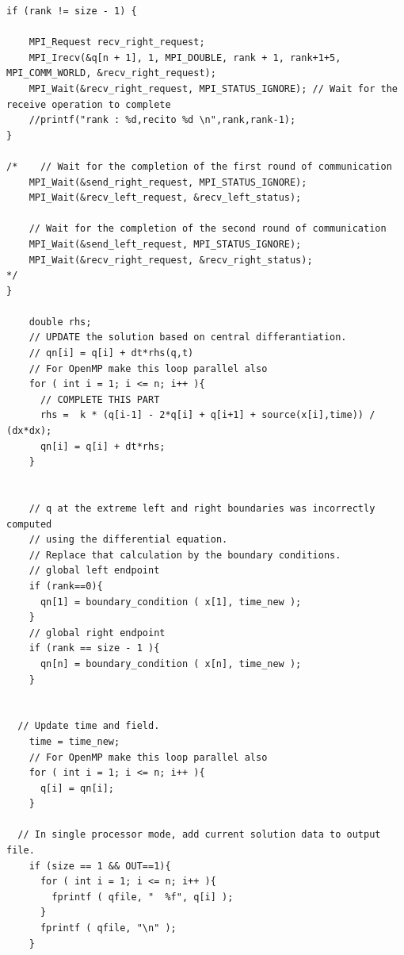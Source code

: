 \documentclass{article}
\begin{document}
\begin{verbatim}
if (rank != size - 1) {

    MPI_Request recv_right_request;
    MPI_Irecv(&q[n + 1], 1, MPI_DOUBLE, rank + 1, rank+1+5, MPI_COMM_WORLD, &recv_right_request);
    MPI_Wait(&recv_right_request, MPI_STATUS_IGNORE); // Wait for the receive operation to complete
    //printf("rank : %d,recito %d \n",rank,rank-1);
}

/*    // Wait for the completion of the first round of communication
    MPI_Wait(&send_right_request, MPI_STATUS_IGNORE);
    MPI_Wait(&recv_left_request, &recv_left_status);

    // Wait for the completion of the second round of communication
    MPI_Wait(&send_left_request, MPI_STATUS_IGNORE);
    MPI_Wait(&recv_right_request, &recv_right_status);
*/
}

    double rhs;
    // UPDATE the solution based on central differantiation.
    // qn[i] = q[i] + dt*rhs(q,t)
    // For OpenMP make this loop parallel also
    for ( int i = 1; i <= n; i++ ){
      // COMPLETE THIS PART
      rhs =  k * (q[i-1] - 2*q[i] + q[i+1] + source(x[i],time)) / (dx*dx); 
      qn[i] = q[i] + dt*rhs;
    }

  
    // q at the extreme left and right boundaries was incorrectly computed
    // using the differential equation.  
    // Replace that calculation by the boundary conditions.
    // global left endpoint 
    if (rank==0){
      qn[1] = boundary_condition ( x[1], time_new );
    }
    // global right endpoint 
    if (rank == size - 1 ){
      qn[n] = boundary_condition ( x[n], time_new );
    }


  // Update time and field.
    time = time_new;
    // For OpenMP make this loop parallel also
    for ( int i = 1; i <= n; i++ ){
      q[i] = qn[i];
    }

  // In single processor mode, add current solution data to output file.
    if (size == 1 && OUT==1){
      for ( int i = 1; i <= n; i++ ){
        fprintf ( qfile, "  %f", q[i] );
      }
      fprintf ( qfile, "\n" );
    }





\end{verbatim}
\end{document}
